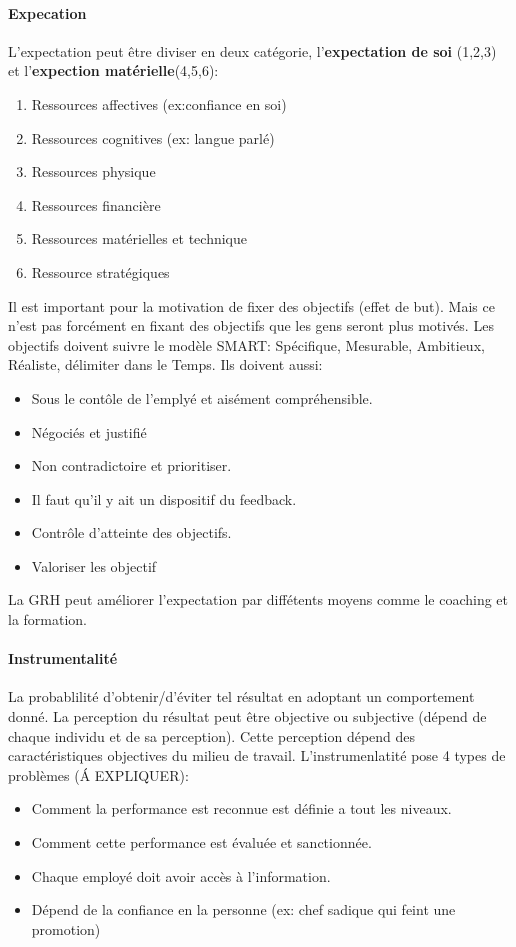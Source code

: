 \documentclass[11pt]{article} %
\begin{document}
		\paragraph{Expecation} L'expectation peut être diviser en deux catégorie, l'\textbf{expectation de soi}
		(1,2,3) et l'\textbf{expection matérielle}(4,5,6):
		\begin{multicols}{2}
			\begin{enumerate}
				\item Ressources affectives (ex:confiance en soi)
				\item Ressources cognitives (ex: langue parlé)
				\item Ressources physique
				\item Ressources financière
				\item Ressources matérielles et technique
				\item Ressource stratégiques
			\end{enumerate}
		\end{multicols}
		Il est important pour la motivation de fixer des objectifs (effet de but). Mais ce n'est pas forcément en 
		fixant des objectifs que les gens seront plus motivés. Les objectifs doivent suivre le modèle SMART:
		 Spécifique, Mesurable, Ambitieux, Réaliste, délimiter dans le Temps. Ils doivent aussi:
		 \begin{multicols}{2}
		 	\begin{itemize}
		 		\item Sous le contôle de l'emplyé et aisément compréhensible.
		 		\item Négociés et justifié
		 		\item Non contradictoire et prioritiser.
		 		\item Il faut qu'il y ait un dispositif du feedback.
		 		\item Contrôle d'atteinte des objectifs.
		 		\item Valoriser les objectif
		 	\end{itemize}
		 \end{multicols}
		 La GRH peut améliorer l'expectation par diffétents moyens comme le coaching et la formation.
		 
		 \paragraph{Instrumentalité} La probablilité d'obtenir/d'éviter tel résultat en adoptant un
		 comportement donné. La perception du résultat peut être objective ou subjective (dépend de chaque 
		 individu et de sa perception). Cette perception dépend des caractéristiques objectives du milieu de 
		 travail.
		 L'instrumenlatité pose 4 types de problèmes (Á EXPLIQUER):
		 \begin{itemize}
		 	\item Comment la performance est reconnue est définie a tout les niveaux.
		 	\item Comment cette performance est évaluée et sanctionnée.
		 	\item Chaque employé doit avoir accès à l'information.
		 	\item Dépend de la confiance en la personne (ex: chef sadique qui feint une promotion)
		 \end{itemize}
		 
\end{document}
